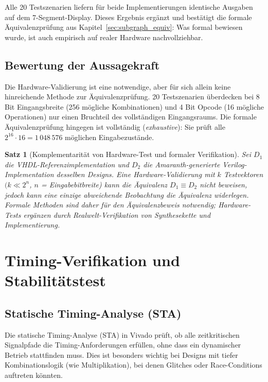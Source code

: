 ﻿\documentclass[12pt,a4paper]{report}
\newtheorem{theorem}{Satz}[section]
\begin{document}
Alle 20 Testszenarien liefern für beide Implementierungen identische Ausgaben auf dem 7-Segment-Display. Dieses Ergebnis ergänzt und bestätigt die formale Äquivalenzprüfung aus Kapitel~\ref{sec:subgraph_equiv}: Was formal bewiesen wurde, ist auch empirisch auf realer Hardware nachvollziehbar.

\subsection{Bewertung der Aussagekraft}
\label{subsec:aussagekraft}

Die Hardware-Validierung ist eine notwendige, aber für sich allein keine hinreichende Methode zur Äquivalenzprüfung. 20 Testszenarien überdecken bei 8 Bit Eingangsbreite (256 mögliche Kombinationen) und 4 Bit Opcode (16 mögliche Operationen) nur einen Bruchteil des vollständigen Eingangsraums. Die formale Äquivalenzprüfung hingegen ist vollständig (\textit{exhaustive}): Sie prüft alle $2^{16} \cdot 16 = 1\,048\,576$ möglichen Eingabezustände.

\begin{theorem}[Komplementarität von Hardware-Test und formaler Verifikation]
Sei $D_1$ die VHDL-Referenzimplementation und $D_2$ die Amaranth-generierte Verilog-Implementation desselben Designs. Eine Hardware-Validierung mit $k$ Testvektoren $(k \ll 2^n$, $n$ = Eingabebitbreite) kann die Äquivalenz $D_1 \equiv D_2$ nicht beweisen, jedoch kann eine einzige abweichende Beobachtung die Äquivalenz widerlegen. Formale Methoden sind daher für den Äquivalenzbeweis notwendig; Hardware-Tests ergänzen durch Realwelt-Verifikation von Synthesekette und Implementierung.
\end{theorem}

\section{Timing-Verifikation und Stabilitätstest}
\label{sec:timing_stabilitaet}

\subsection{Statische Timing-Analyse (STA)}
\label{subsec:sta}

Die statische Timing-Analyse (STA) in Vivado prüft, ob alle zeitkritischen Signalpfade die Timing-Anforderungen erfüllen, ohne dass ein dynamischer Betrieb stattfinden muss. Dies ist besonders wichtig bei Designs mit tiefer Kombinationslogik (wie Multiplikation), bei denen Glitches oder Race-Conditions auftreten könnten.
\end{document}

